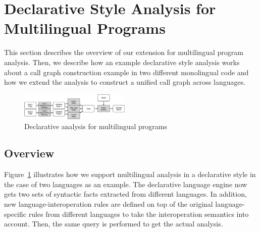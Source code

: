 
\section{Declarative Style Analysis for Multilingual Programs}
This section describes the overview of our extension for multilingual program
analysis. Then, we describe how an example declarative style analysis works
about a call graph construction example in two different monolingual code and
how we extend the analysis to construct a unified call graph across languages.

\begin{figure}[t]
  \centering
  \vspace{2mm}
  \includegraphics[width=0.47\textwidth]{img/ov2.png}
  \caption{Declarative analysis for multilingual programs}
  \label{fig:ov2}
\end{figure}

\subsection{Overview}
Figure~\ref{fig:ov2} illustrates how we support multilingual analysis in a
declarative style in the case of two languages as an example. The declarative
language engine now gets two sets of syntactic facts extracted from different
languages. In addition, new language-interoperation rules are defined on top of
the original language-specific rules from different languages to take the
interoperation semantics into account. Then, the same query is performed to get
the actual analysis.



